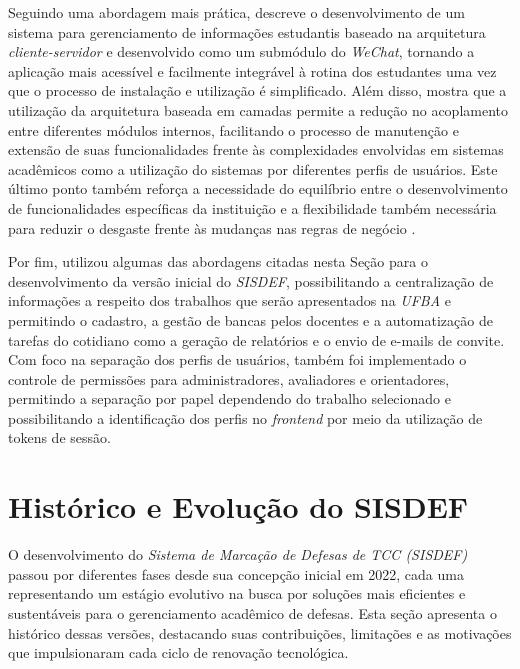\documentclass[nonacm, sigconf]{acmart}
\begin{document}
Seguindo uma abordagem mais prática, \cite{wu2020} descreve o desenvolvimento de um sistema para gerenciamento de informações estudantis baseado na arquitetura \textit{cliente-servidor} e desenvolvido como um submódulo do \textit{WeChat}, tornando a aplicação mais acessível e facilmente integrável à rotina dos estudantes uma vez que o processo de instalação e utilização é simplificado. Além disso, mostra que a utilização da arquitetura baseada em camadas permite a redução no acoplamento entre diferentes módulos internos, facilitando o processo de manutenção e extensão de suas funcionalidades frente às complexidades envolvidas em sistemas acadêmicos como a utilização do sistemas por diferentes perfis de usuários. Este último ponto também reforça a necessidade do equilíbrio entre o desenvolvimento de funcionalidades específicas da instituição e a flexibilidade também necessária para reduzir o desgaste frente às mudanças nas regras de negócio \cite{rainer2015introducao, sis}.

Por fim, \cite{gabrieltcc} utilizou algumas das abordagens citadas nesta Seção para o desenvolvimento da versão inicial do \textit{SISDEF}, possibilitando a centralização de informações a respeito dos trabalhos que serão apresentados na \textit{UFBA} e permitindo o cadastro, a gestão de bancas pelos docentes e a automatização de tarefas do cotidiano como a geração de relatórios e o envio de e-mails de convite. Com foco na separação dos perfis de usuários, também foi implementado o controle de permissões para administradores, avaliadores e orientadores, permitindo a separação por papel dependendo do trabalho selecionado e possibilitando a identificação dos perfis no \textit{frontend} por meio da utilização de tokens de sessão.

\section{Histórico e Evolução do SISDEF}
\label{section:sisdef_history}

O desenvolvimento do \textit{Sistema de Marcação de Defesas de TCC (SISDEF)} passou por diferentes fases desde sua concepção inicial em 2022, cada uma representando um estágio evolutivo na busca por soluções mais eficientes e sustentáveis para o gerenciamento acadêmico de defesas. Esta seção apresenta o histórico dessas versões, destacando suas contribuições, limitações e as motivações que impulsionaram cada ciclo de renovação tecnológica.
\end{document}

